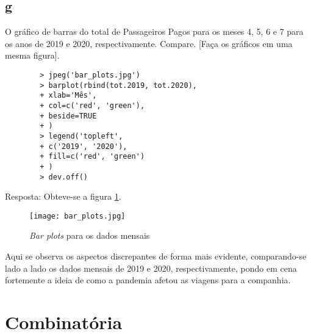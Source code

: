 \documentclass{article}[twocolumn]
\begin{document}
	\subsection{g}
	O gráfico de barras do total de Passageiros Pagos para os meses 4, 5, 6 e 7 para os anos
	de 2019 e 2020, respectivamente. Compare. [Faça os gráficos em uma mesma figura].
	\begin{verbatim}
		> jpeg('bar_plots.jpg')
		> barplot(rbind(tot.2019, tot.2020),
		+ xlab='Mês',
		+ col=c('red', 'green'),
		+ beside=TRUE
		+ )
		> legend('topleft',
		+ c('2019', '2020'),
		+ fill=c('red', 'green')
		+ )
		> dev.off()
	\end{verbatim}
	Resposta: Obteve-se a figura \ref{fig:barplots}.
	\begin{figure}[H]
		\centering
		\texttt{[image: bar\_plots.jpg]}
		\caption{\textit{Bar plots} para os dados mensais}
		\label{fig:barplots}
	\end{figure}
	Aqui se observa os aspectos discrepantes de forma mais evidente, comparando-se lado a lado
	os dados mensais de 2019 e 2020, respectivamente, pondo em cena fortemente a ideia de como a
	pandemia afetou as viagens para a companhia.
	\section{Combinatória}
\end{document}
